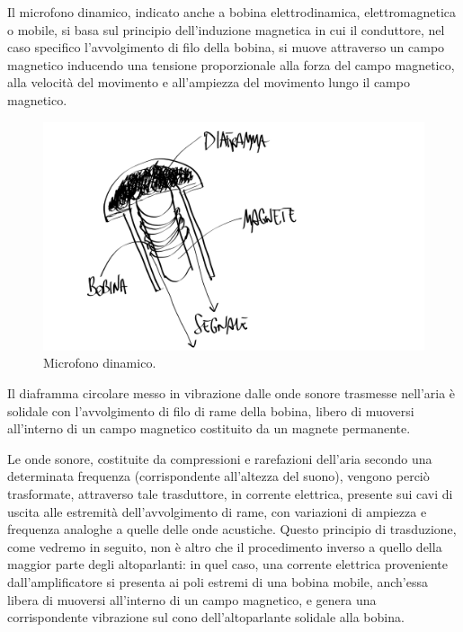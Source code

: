 \begin{refsection}
Il microfono dinamico, indicato anche a bobina elettrodinamica,
elettromagnetica o mobile, si basa sul principio dell'induzione magnetica in cui
il conduttore, nel caso specifico l'avvolgimento di filo della bobina, si muove
attraverso un campo magnetico inducendo una tensione proporzionale alla forza
del campo magnetico, alla velocità del movimento e all'ampiezza del movimento
lungo il campo magnetico.

\begin{figure}[h]
\centering
\includegraphics[width=0.99\columnwidth]{CAPITOLI/0200/img/mic-dinamic.png}
\caption[]{Microfono dinamico.}
\label{mic:dinamico}
\end{figure}


Il diaframma circolare messo in vibrazione dalle onde sonore trasmesse nell’aria
è solidale con l'avvolgimento di filo di rame della bobina, libero di muoversi
all’interno di un campo magnetico costituito da un magnete permanente.

Le onde sonore, costituite da compressioni e rarefazioni dell’aria secondo una
determinata frequenza (corrispondente all’altezza del suono), vengono perciò
trasformate, attraverso tale trasduttore, in corrente elettrica, presente sui
cavi di uscita alle estremità dell’avvolgimento di rame, con variazioni di
ampiezza e frequenza analoghe a quelle delle onde acustiche. Questo
principio di trasduzione, come vedremo in seguito, non è altro che il
procedimento inverso a quello della maggior parte degli altoparlanti: in quel
caso, una corrente elettrica proveniente dall’amplificatore si presenta ai
poli estremi di una bobina mobile, anch’essa libera di muoversi all’interno di
un campo magnetico, e genera una corrispondente vibrazione sul cono
dell’altoparlante solidale alla bobina.


\end{refsection}
